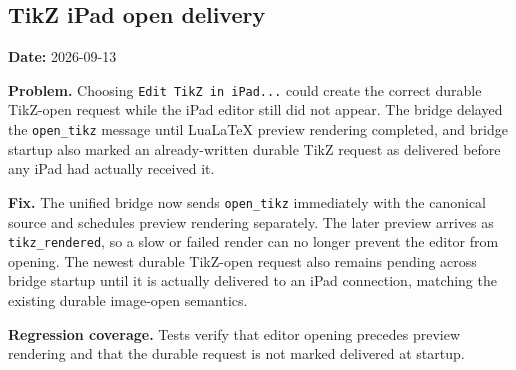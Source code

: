 \documentclass[a4paper]{article}
\title{}
\date{}
\author{Mohammad Rahmani}
\begin{document}
   \maketitle

   \begin{preview}
      \section*{TikZ iPad open delivery}
      \textbf{Date:} 2026-09-13

      \textbf{Problem.}
      Choosing \texttt{Edit TikZ in iPad...} could create the correct durable
      TikZ-open request while the iPad editor still did not appear.  The bridge
      delayed the \texttt{open\_tikz} message until LuaLaTeX preview rendering
      completed, and bridge startup also marked an already-written durable TikZ
      request as delivered before any iPad had actually received it.

      \textbf{Fix.}
      The unified bridge now sends \texttt{open\_tikz} immediately with the
      canonical source and schedules preview rendering separately.  The later
      preview arrives as \texttt{tikz\_rendered}, so a slow or failed render can
      no longer prevent the editor from opening.  The newest durable TikZ-open
      request also remains pending across bridge startup until it is actually
      delivered to an iPad connection, matching the existing durable image-open
      semantics.

      \textbf{Regression coverage.}
      Tests verify that editor opening precedes preview rendering and that the
      durable request is not marked delivered at startup.
   \end{preview}

   
   
\end{document}
